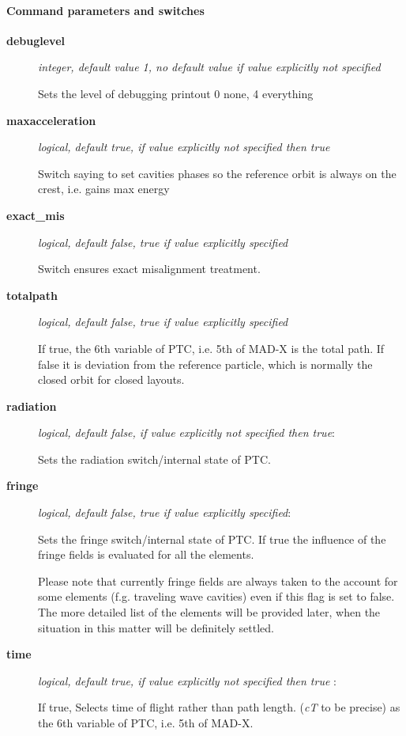 \paragraph{ Command parameters and switches }
\begin{description}
	\item[\textbf{debuglevel}] \textit{ integer, default value 1, no default value if value explicitly not specified}

 Sets the level of debugging printout 0 none, 4 everything   
	\item[\textbf{maxacceleration}] \textit{ logical, default true, if value explicitly not specified then true }

 Switch saying to set cavities phases so the reference orbit is always on the crest, i.e. gains max energy   
	\item[\textbf{ exact\_mis }] \textit{ logical, default false, true if value explicitly specified }

 Switch ensures exact misalignment treatment.   
	\item[\textbf{ totalpath }] \textit{ logical, default false, true if value explicitly specified }

 If true, the 6th variable of PTC, i.e. 5th of MAD-X is the total path.       If false it is deviation from the reference particle, which is normally the closed orbit for closed       layouts.   
	\item[\textbf{ radiation }] \textit{ logical, default false, if value explicitly not specified then true}:    

 Sets the radiation switch/internal state of PTC.   
	\item[\textbf{ fringe }] \textit{ logical, default false, true if value explicitly specified}:    

 Sets the fringe switch/internal state of PTC. If true the influence of the fringe fields is evaluated for       all the elements.    

 Please note that currently fringe fields are always taken to the account for some elements       (f.g. traveling wave cavities) even if this flag is set to false.        The more detailed list of the elements will be provided later,        when the situation in this matter will be definitely settled.   
	\item[\textbf{ time }] \textit{ logical, default true, if value explicitly not specified then true }:    

 If true, Selects time of flight rather than path length. (\textit{cT} to be precise)       as the 6th variable of PTC, i.e. 5th of MAD-X.   
\end{description}

